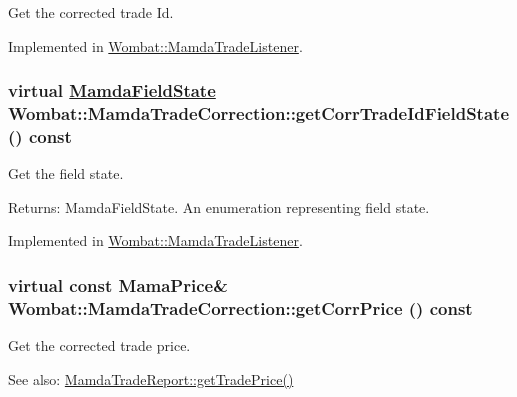 Get the corrected trade Id. 



Implemented in \hyperlink{classWombat_1_1MamdaTradeListener_307d09719f4d878bdaeb211a6aa38465}{Wombat::Mamda\-Trade\-Listener}.\hypertarget{classWombat_1_1MamdaTradeCorrection_a00b0ac006b165b500fb5e97f1852c1a}{
\subsubsection[getCorrTradeIdFieldState]{\setlength{\rightskip}{0pt plus 5cm}virtual \hyperlink{namespaceWombat_93aac974f2ab713554fd12a1fa3b7d2a}{Mamda\-Field\-State} Wombat::Mamda\-Trade\-Correction::get\-Corr\-Trade\-Id\-Field\-State () const}}
\label{classWombat_1_1MamdaTradeCorrection_a00b0ac006b165b500fb5e97f1852c1a}


Get the field state. 

\begin{Desc}
\item[Returns:]Mamda\-Field\-State. An enumeration representing field state. \end{Desc}


Implemented in \hyperlink{classWombat_1_1MamdaTradeListener_8598485802bcf8f1290f36ecfa964d99}{Wombat::Mamda\-Trade\-Listener}.\hypertarget{classWombat_1_1MamdaTradeCorrection_0f93bfcc5a56537cc99a48238e9e6e49}{
\subsubsection[getCorrPrice]{\setlength{\rightskip}{0pt plus 5cm}virtual const Mama\-Price\& Wombat::Mamda\-Trade\-Correction::get\-Corr\-Price () const}}
\label{classWombat_1_1MamdaTradeCorrection_0f93bfcc5a56537cc99a48238e9e6e49}


Get the corrected trade price. 

\begin{Desc}
\item[See also:]\hyperlink{classWombat_1_1MamdaTradeReport_97a38026a45edb298ffe62530d43cde4}{Mamda\-Trade\-Report::get\-Trade\-Price()} \end{Desc}


